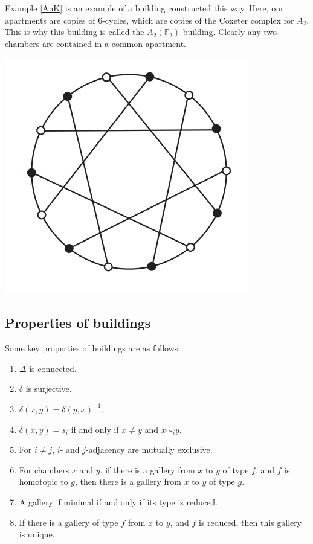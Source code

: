 \documentclass[11pt]{article}
\begin{document}
\begin{example}
    Example \ref{AnK} is an example of a building constructed this way. Here, our apartments are copies of 6-cycles, which are copies of the Coxeter complex for $A_2$. This is why this building is called the $A_2(\mathbb{F}_2)$ building. Clearly any two chambers are contained in a common apartment. 
    \begin{center}
        \includegraphics[scale=0.5]{Screenshot 2023-03-16 131651.png}\\
    \end{center}
\end{example}


\subsection{Properties of buildings}
Some key properties of buildings are as follows:
\begin{enumerate}
    \item $\Delta$ is connected.
    \item $\delta$ is surjective.
    \item $\delta(x,y)=\delta(y,x)^{-1}$.
    \item $\delta(x,y)=s_i$ if and only if $x\neq y$ and $x\sim_i y$.
    \item For $i\neq j$, $i$- and $j$-adjacency are mutually exclusive.
    \item For chambers $x$ and $y$, if there is a gallery from $x$ to $y$ of type $f$, and $f$ is homotopic to $g$, then there is a gallery from $x$ to $y$ of type $g$. 
    \item A gallery if minimal if and only if its type is reduced.
    \item If there is a gallery of type $f$ from $x$ to $y$, and $f$ is reduced, then this gallery is unique.
\end{enumerate}
\end{document}
